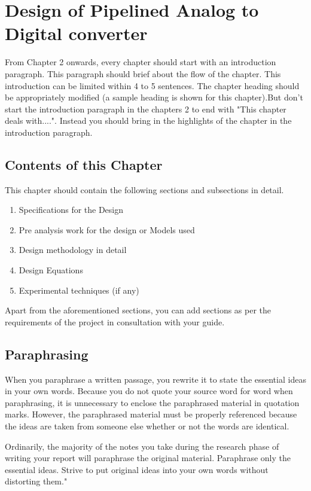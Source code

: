 \chapter{Design of Pipelined Analog to Digital converter}

\indent\indent From Chapter 2 onwards, every chapter should start with an introduction paragraph. This paragraph should brief about the flow of the chapter. This introduction can be limited within 4 to 5 sentences. The chapter heading should be appropriately modified (a sample heading is shown for this chapter).But don't start the introduction paragraph in the chapters 2 to end with "This chapter deals with....". Instead you should bring in the highlights of the chapter in the introduction paragraph. 
\section{Contents of this Chapter}
This chapter should contain the following sections and subsections in detail.
\begin{enumerate}
\item Specifications for the Design
\item Pre analysis work for the design or Models used
\item Design methodology in detail
\item Design Equations
\item Experimental techniques (if any)
\end{enumerate}
Apart from the aforementioned sections, you can add sections as per the requirements of the project in consultation with your guide.

\section{Paraphrasing}
When you paraphrase a written passage, you rewrite it to state the essential ideas in your own words. Because you do not quote your source word for word when paraphrasing, it is unnecessary to enclose the paraphrased material in quotation marks. However, the paraphrased material must be properly referenced because the ideas are taken from someone else whether or not the words are identical. 

Ordinarily, the majority of the notes you take during the research phase of writing your report will paraphrase the original material. Paraphrase only the essential ideas. Strive to put original ideas into your own words without distorting them."

